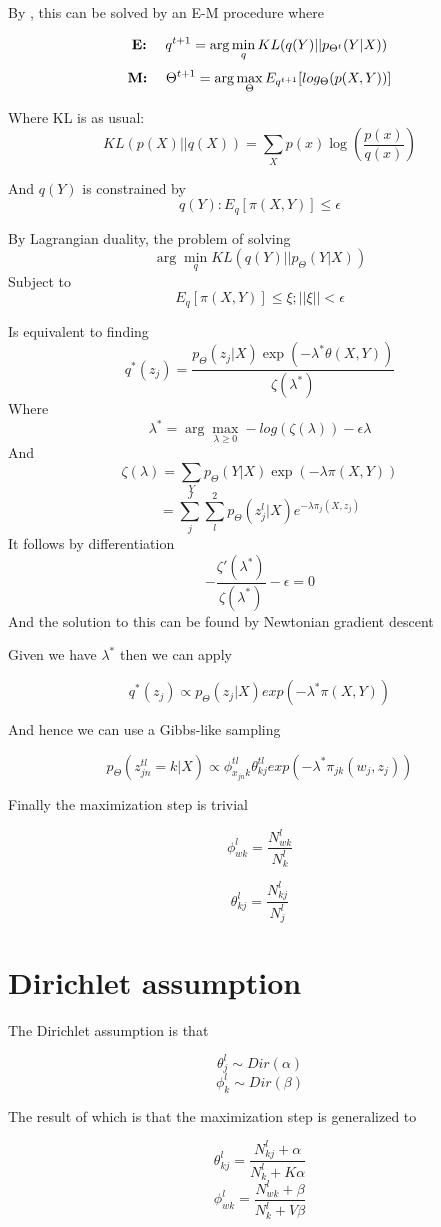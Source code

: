 \documentclass[a4paper,10pt]{article}
\begin{document}
By \cite{ganchev}, this can be solved by an E-M procedure where

\[
 \textrm{\bf{E}:}~~~~ q^{t+1} = \arg\min_q KL(q(Y) || p_{\Theta^t} (Y | X))
\]
\[
 \textrm{\bf{M}:}~~~~ \Theta^{t+1} = \arg\max_\Theta
E_{q^{t+1}}[log_\Theta(p(X,Y))]
\]

Where KL is as usual:
\[
 KL(p(X)||q(X)) = \sum_X p(x) \log\left(\frac{p(x)}{q(x)}\right)
\]

And $q(Y)$ is constrained by
\[
 q(Y) : E_q[\pi(X,Y)] \leq \epsilon
\]

By Lagrangian duality, the problem of solving
\[
 \arg\min_q KL(q(Y) || p_{\Theta} (Y | X))
\]
Subject to
\[
 E_q[\pi(X,Y)] \leq \xi ; ||\xi|| < \epsilon
\]

Is equivalent to finding
\[
 q^*(z_j) = \frac{p_\Theta(z_j|X) \exp(-\lambda^*
\theta(X,Y))}{\zeta(\lambda^*)}
\]
Where
\[
 \lambda^* = \arg\max_{\lambda \geq 0} - log(\zeta(\lambda)) - \epsilon\lambda
\]
And
\[
 \zeta(\lambda) = \sum_Y p_\Theta(Y|X) \exp(-\lambda \pi(X,Y))
 \]
 \[
 = \sum_j^J\sum_l^2 p_\Theta(z^l_j|X) e^{-
\lambda \pi_j(X,z_j)}
\]
It follows by differentiation
\[
 -\frac{\zeta'(\lambda^*)}{\zeta(\lambda^*)} - \epsilon = 0
\]
And the solution to this can be found by Newtonian gradient descent

Given we have $\lambda^*$ then we can apply

\[
 q^*(z_j) \propto p_\Theta(z_j|X) exp(-\lambda^*\pi(X,Y))
\]

And hence we can use a Gibbs-like sampling

\[
 p_\Theta(z^{tl}_{jn} = k|X) \propto
\phi^{tl}_{x_{jn}k}\theta^{tl}_{kj}exp(-\lambda^*\pi_{jk}(w_j,z_j))
\]

Finally the maximization step is trivial

\[
 \phi^l_{wk} = \frac{N^l_{wk}}{N^l_k}
\]

\[
 \theta^l_{kj} = \frac{N^l_{kj}}{N^l_j}
\]

\section{Dirichlet assumption}

The Dirichlet assumption is that 

\[
 \theta^l_j \sim Dir(\alpha)
\]
\[
 \phi^l_k \sim Dir(\beta)
\]

The result of which is that the maximization step is generalized
to~\cite{porteous}

\[
 \theta^l_{kj} = \frac{N^l_{kj} + \alpha}{N^l_k + K\alpha}
\]
\[
 \phi^l_{wk} = \frac{N^l_{wk} + \beta}{N^l_k + V \beta}
\]
\end{document}
